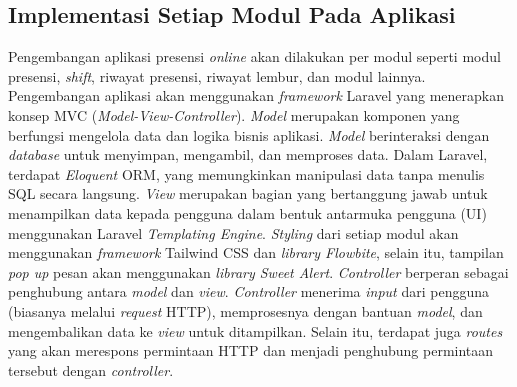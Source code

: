 \subsection{Implementasi Setiap Modul Pada Aplikasi}
Pengembangan aplikasi presensi \textit{online} akan dilakukan per modul seperti modul presensi, \textit{shift}, riwayat presensi, riwayat lembur, dan modul lainnya. Pengembangan aplikasi akan menggunakan \textit{framework} Laravel yang menerapkan konsep MVC (\textit{Model-View-Controller}). \textit{Model} merupakan komponen yang berfungsi mengelola data dan logika bisnis aplikasi. \textit{Model} berinteraksi dengan \textit{database} untuk menyimpan, mengambil, dan memproses data. Dalam Laravel, terdapat \textit{Eloquent} ORM, yang memungkinkan manipulasi data tanpa menulis SQL secara langsung. \textit{View} merupakan bagian yang bertanggung jawab untuk menampilkan data kepada pengguna dalam bentuk antarmuka pengguna (UI) menggunakan Laravel \textit{Templating Engine}. \textit{Styling} dari setiap modul akan menggunakan \textit{framework} Tailwind CSS dan \textit{library Flowbite}, selain itu, tampilan \textit{pop up} pesan akan menggunakan \textit{library Sweet Alert}. \textit{Controller} berperan sebagai penghubung antara \textit{model} dan \textit{view}. \textit{Controller} menerima \textit{input} dari pengguna (biasanya melalui \textit{request} HTTP), memprosesnya dengan bantuan \textit{model}, dan mengembalikan data ke \textit{view} untuk ditampilkan. Selain itu, terdapat juga \textit{routes} yang akan merespons permintaan HTTP dan menjadi penghubung permintaan tersebut dengan \textit{controller}.

